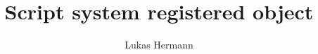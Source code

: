 \documentclass[12pt, a4paper]{article}
\begin{document}
\title{Script system registered object}
\author{Lukas Hermann}
\maketitle

\tableofcontents

\newpage


\end{document}
